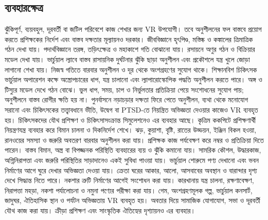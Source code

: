 \begin{topicbody}
\subsection{ব্যবহারক্ষেত্র}
ঝুঁকিপূর্ণ, ব্যয়বহুল, দূরবর্তী বা জটিল পরিবেশে কাজ শেখার জন্য VR উপযোগী। তবে অনুশীলনের ফল বাস্তবে প্রয়োগ করতে প্রশিক্ষকের নির্দেশ এবং বাস্তব দক্ষতার মূল্যায়নও দরকার।
জীববিজ্ঞানে হৃৎপিণ্ড, মস্তিষ্ক ও কঙ্কালের ত্রিমাত্রিক গঠন দেখা যায়। পদার্থবিজ্ঞানে তরঙ্গ, তড়িৎক্ষেত্র ও মহাকাশে গতি বোঝানো যায়। রসায়নে অণুর গঠন ও বিক্রিয়ার মডেল দেখা যায়। ভার্চুয়াল ল্যাবে বাস্তব রাসায়নিক দুর্ঘটনার ঝুঁকি ছাড়া অনুশীলন এবং প্রকৌশলে যন্ত্র খুলে জোড়া লাগানো শেখা যায়। নিজস্ব গতিতে বারবার অনুশীলন ও দূর থেকে অংশগ্রহণের সুযোগ থাকে।
শিক্ষানবিশ চিকিৎসক ভার্চুয়াল অপারেশন কক্ষে অস্ত্রোপচারের ধাপ, যন্ত্র চালানো এবং ল্যাপারোস্কোপিক পদ্ধতি অনুশীলন করতে পারে। অঙ্গ ও টিস্যুর মডেল দেখে গঠন বোঝে। ভুল ধাপ, সময়, চাপ ও নির্ভুলতার প্রতিক্রিয়া পেয়ে সংশোধনের সুযোগ পায়; অনুশীলনে বাস্তব রোগীর ক্ষতি হয় না।
পুনর্বাসনে নড়াচড়ার দক্ষতা ফিরে পেতে অনুশীলন, ব্যথা থেকে মনোযোগ সরানো এবং চিকিৎসকের তত্ত্বাবধানে ভীতি, উদ্বেগ বা PTSD-তে নিয়ন্ত্রিত অভিজ্ঞতা দেওয়ার কাজেও VR ব্যবহৃত হয়। চিকিৎসকদের যৌথ প্রশিক্ষণ ও চিকিৎসাসংক্রান্ত সিমুলেশনেও এর ব্যবহার আছে।
কৃত্রিম ককপিটে প্রশিক্ষণার্থী নিয়ন্ত্রণযন্ত্র ব্যবহার করে বিমান চালনা ও দিকনির্দেশ শেখে। ঝড়, কুয়াশা, বৃষ্টি, রাতের উড্ডয়ন, ইঞ্জিন বিকল হওয়া, রানওয়ের সমস্যা ও জরুরি অবতরণ বারবার অনুশীলন করা যায়। প্রশিক্ষক কাজ পর্যবেক্ষণ করে নম্বর ও প্রতিক্রিয়া দিতে পারেন। বাস্তব বিমান, অস্ত্র বা বিপজ্জনক পরিস্থিতি ব্যবহারের ব্যয় ও ঝুঁকি কমানো যায়। সামরিক কৌশল, উদ্ধারকাজ, অগ্নিনিরাপত্তা এবং জরুরি পরিস্থিতির সাড়াদানেও একই সুবিধা পাওয়া যায়।
ভার্চুয়াল শোরুমে পণ্য দেখানো এবং ভবন নির্মাণের আগে ঘুরে দেখার অভিজ্ঞতা দেওয়া যায়। ক্রেতা ঘরের আকার, আলো, আসবাবের অবস্থান ও বারান্দার দৃশ্য দেখে সিদ্ধান্ত নিতে পারে। নকশার ত্রুটি নির্মাণের আগেই সংশোধন করা যায়। কারখানায় যন্ত্র চালনা, রক্ষণাবেক্ষণ, নিরাপত্তা মহড়া, নকশা পর্যালোচনা ও নমুনা পণ্যের পরীক্ষা করা যায়।
গেম, অংশগ্রহণমূলক গল্প, ভার্চুয়াল কনসার্ট, জাদুঘর, ঐতিহাসিক স্থান ও পর্যটন অভিজ্ঞতায় VR ব্যবহৃত হয়। অবতার দিয়ে সামাজিক যোগাযোগ, সভা ও দূরবর্তী যৌথ কাজ করা যায়। ক্রীড়া প্রশিক্ষণ এবং সাংস্কৃতিক ঐতিহ্যের দৃশ্যায়নও এর ব্যবহার।

\end{topicbody}
